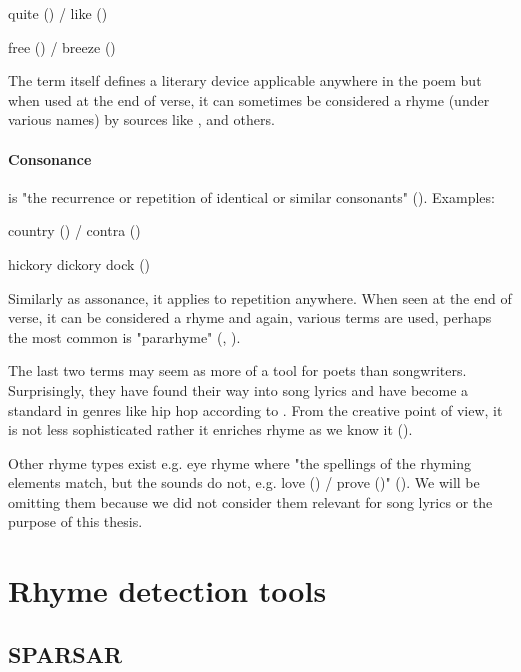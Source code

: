 quite () / like ()

free () / breeze ()

\noindent The term itself defines a literary device applicable anywhere in the poem but when used at the end of verse, it can sometimes be considered a rhyme (under various names) by sources like \cite{vanphonological}, \cite{bergman2017litcharts} and others.

\paragraph{Consonance} is "the recurrence or repetition of identical or similar consonants" (\cite{britannica}). Examples: 

country () / contra ()

hickory dickory dock ()

\noindent Similarly as assonance, it applies to repetition anywhere. When seen at the end of verse, it can be considered a rhyme and again, various terms are used, perhaps the most common is "pararhyme" (\cite{britannica}, \cite{oxforddict2008literary}).
\newline

The last two terms may seem as more of a tool for poets than songwriters. Surprisingly, they have found their way into song lyrics and have become a standard in genres like hip hop according to \cite{vanphonological}. From the creative point of view, it is not less sophisticated rather it enriches rhyme as we know it (\cite{brogan2016poeticterms}).

Other rhyme types exist e.g. eye rhyme where "the spellings of the rhyming elements match, but the sounds do not, e.g. love () / prove ()" (\cite{oxforddict2008literary}). We will be omitting them because we did not consider them relevant for song lyrics or the purpose of this thesis.


\section{Rhyme detection tools}
\subsection{SPARSAR}


